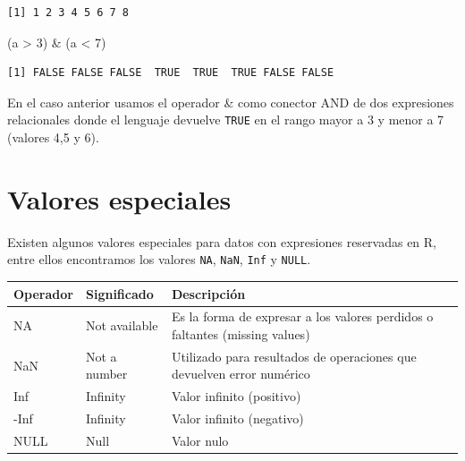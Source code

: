 \documentclass[
  spanish,
  a4paper,
]{scrbook}
\newenvironment{Shaded}{\begin{snugshade}}{\end{snugshade}}
\newcommand{\DecValTok}[1]{\textcolor[rgb]{0.68,0.00,0.00}{#1}}
\newcommand{\NormalTok}[1]{\textcolor[rgb]{0.00,0.23,0.31}{#1}}
\newcommand{\SpecialCharTok}[1]{\textcolor[rgb]{0.37,0.37,0.37}{#1}}
\newcounter{none} %
\begin{document}
\begin{verbatim}
[1] 1 2 3 4 5 6 7 8
\end{verbatim}

\begin{Shaded}
\begin{Highlighting}[]
\NormalTok{(a }\SpecialCharTok{\textgreater{}} \DecValTok{3}\NormalTok{) }\SpecialCharTok{\&}\NormalTok{ (a }\SpecialCharTok{\textless{}} \DecValTok{7}\NormalTok{)}
\end{Highlighting}
\end{Shaded}

\begin{verbatim}
[1] FALSE FALSE FALSE  TRUE  TRUE  TRUE FALSE FALSE
\end{verbatim}

En el caso anterior usamos el operador \& como conector AND de dos
expresiones relacionales donde el lenguaje devuelve \texttt{TRUE} en el
rango mayor a 3 y menor a 7 (valores 4,5 y 6).

\section{Valores especiales}\label{valores-especiales}

Existen algunos valores especiales para datos con expresiones reservadas
en R, entre ellos encontramos los valores \texttt{NA}, \texttt{NaN},
\texttt{Inf} y \texttt{NULL}.

{\def\LTcaptype{none} %
\begin{longtable}[]{@{}
  >{\raggedright\arraybackslash}p{}
  >{\raggedright\arraybackslash}p{}
  >{\raggedright\arraybackslash}p{}@{}}
\toprule\noalign{}
\begin{minipage}[b]{\linewidth}\raggedright
Operador
\end{minipage} & \begin{minipage}[b]{\linewidth}\raggedright
Significado
\end{minipage} & \begin{minipage}[b]{\linewidth}\raggedright
Descripción
\end{minipage} \\
\midrule\noalign{}
\endhead
\bottomrule\noalign{}
\endlastfoot
NA & Not available & Es la forma de expresar a los valores perdidos o
faltantes (missing values) \\
NaN & Not a number & Utilizado para resultados de operaciones que
devuelven error numérico \\
Inf & Infinity & Valor infinito (positivo) \\
-Inf & Infinity & Valor infinito (negativo) \\
NULL & Null & Valor nulo \\
\end{longtable}
}
\end{document}
